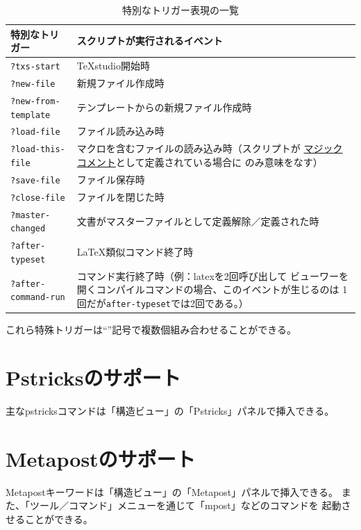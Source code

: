 \begin{table}[H]
  \centering
  \caption{特別なトリガー表現の一覧}
  \begin{tabularx}{\linewidth}{lX}
    \hline
    \textbf{特別なトリガー} & \textbf{スクリプトが実行されるイベント}\\
    \hline
    \texttt{?txs-start} & TeXstudio開始時\\
    \texttt{?new-file} & 新規ファイル作成時\\
    \texttt{?new-from-template} & テンプレートからの新規ファイル作成時\\
    \texttt{?load-file} & ファイル読み込み時\\
    \texttt{?load-this-file}
      & マクロを含むファイルの読み込み時（スクリプトが
      \hyperref[sec:magiccomment]{マジックコメント}として定義されている場合に
      のみ意味をなす）\\
    \texttt{?save-file} & ファイル保存時\\
    \texttt{?close-file} & ファイルを閉じた時\\
    \texttt{?master-changed} & 文書がマスターファイルとして定義解除／定義された時\\
    \texttt{?after-typeset} & LaTeX類似コマンド終了時\\
    \texttt{?after-command-run}
      & コマンド実行終了時（例：latexを2回呼び出して
      ビューワーを開くコンパイルコマンドの場合、このイベントが生じるのは
      1回だが\texttt{after-typeset}では2回である。）\\
    \hline
  \end{tabularx}
\end{table}

これら特殊トリガーは``\textbar{}''記号で複数個組み合わせることができる。

\section{Pstricksのサポート}

主なpstricksコマンドは「構造ビュー」の「Pstricks」パネルで挿入できる。

\section{Metapostのサポート}

Metapostキーワードは「構造ビュー」の「Metapost」パネルで挿入できる。
また、「ツール／コマンド」メニューを通じて「mpost」などのコマンドを
起動させることができる。

